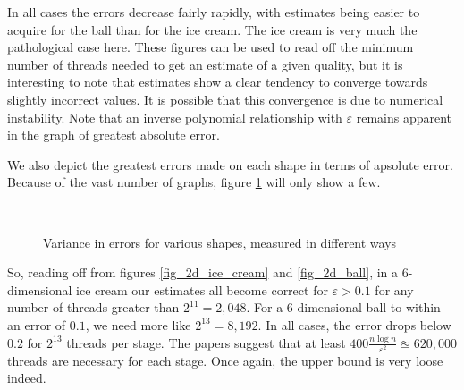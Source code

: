 In all cases the errors decrease fairly rapidly, with estimates being easier to acquire for the ball than for the ice cream. The ice cream is very much the pathological case here. These figures can be used to read off the minimum number of threads needed to get an estimate of a given quality, but it is interesting to note that estimates show a clear tendency to converge towards slightly incorrect values. It is possible that this convergence is due to numerical instability. Note that an inverse polynomial relationship with $\varepsilon$ remains apparent in the graph of greatest absolute error.

We also depict the greatest errors made on each shape in terms of apsolute error. Because of the vast number of graphs, figure \ref{fig_histograms} will only show a few.

\begin{figure}
\centering
{}
\\

\caption{Variance in errors for various shapes, measured in different ways}
\label{fig_histograms}
\end{figure}

So, reading off from figures \ref{fig_2d_ice_cream} and \ref{fig_2d_ball}, in a 6-dimensional ice cream our estimates all become correct for $\varepsilon > 0.1$ for any number of threads greater than $2^11 = 2,048$. For a 6-dimensional ball to within an error of $0.1$, we need more like $2^{13} = 8,192$. In all cases, the error drops below $0.2$ for $2^{13}$ threads per stage. The papers suggest that at least $400\frac{n\log n}{\varepsilon^2} \approxeq 620,000$ threads are necessary for each stage. Once again, the upper bound is very loose indeed.

